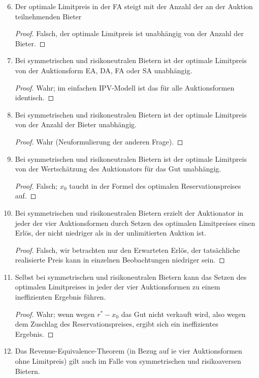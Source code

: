 \documentclass[12pt]{extreport} %
\theoremstyle{named}
\theoremstyle{itshape}
\theoremstyle{normal}
\begin{document}
\begin{enumerate} \setcounter{enumi}{5}
	\item Der optimale Limitpreis in der FA steigt mit der Anzahl der an der Auktion teilnehmenden Bieter 
		\begin{proof}
			Falsch, der optimale Limitpreis ist unabhängig von der Anzahl der Bieter.	
		\end{proof} \setcounter{enumi}{7}
	\item Bei symmetrischen und risikoneutralen Bietern ist der optimale Limitpreis von der Auktionsform EA, DA, FA oder SA unabhängig.
		\begin{proof}
			Wahr; im einfachen IPV-Modell ist das für alle Auktionsformen identisch.
		\end{proof}
	\item Bei symmetrischen und risikoneutralen Bietern ist der optimale Limitpreis von der Anzahl der Bieter unabhängig.
		\begin{proof}
			Wahr (Neuformulierung der anderen Frage).
		\end{proof}
	\item Bei symmetrischen und risikoneutralen Bietern ist der optimale Limitpreis von der Wertschätzung des Auktionators für das Gut unabhängig.
		\begin{proof}
			Falsch; $x_{0}$ taucht in der Formel des optimalen Reservationspreises auf.
		\end{proof}
	\item Bei symmetrischen und risikoneutralen Bietern erzielt der Auktionator in jeder der vier Auktionsformen durch Setzen des optimalen Limitpreises einen Erlös, der nicht niedriger als in der unlimitierten Auktion ist.
		\begin{proof}
			Falsch, wir betrachten nur den Erwarteten Erlös, der tatsächliche realisierte Preis kann in einzelnen Beobachtungen niedriger sein.
		\end{proof}
	\item Selbst bei symmetrischen und risikoneutralen Bietern kann das Setzen des optimalen Limitpreises in jeder der vier Auktionsformen zu einem ineffizienten Ergebnis führen.
		\begin{proof}
			Wahr; wenn wegen $r^{*} - x_{0}$ das Gut nicht verkauft wird, also wegen dem Zuschlag des Reservationspreises, ergibt sich ein ineffizientes Ergebnis.
		\end{proof}\setcounter{enumi}{15}
	\item Das Revenue-Equivalence-Theorem (in Bezug auf ie vier Auktionsformen ohne Limitpreis) gilt auch im Falle von symmetrischen und risikoaversen Bietern.

\end{enumerate}
\end{document}
